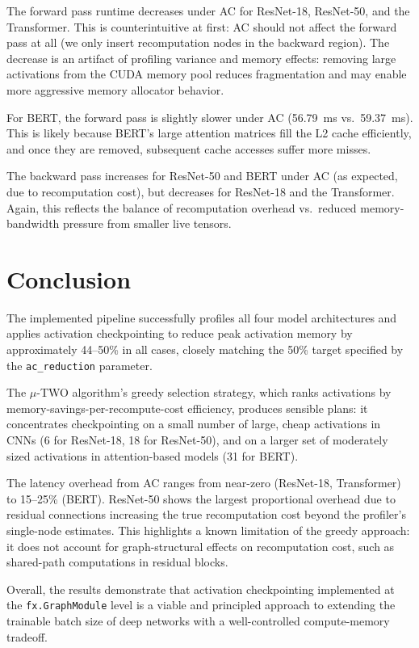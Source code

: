 \documentclass[11pt]{article}
\begin{document}
The forward pass runtime decreases under AC for ResNet-18, ResNet-50, and
the Transformer. This is counterintuitive at first: AC should not affect
the forward pass at all (we only insert recomputation nodes in the backward
region). The decrease is an artifact of profiling variance and memory
effects: removing large activations from the CUDA memory pool reduces
fragmentation and may enable more aggressive memory allocator behavior.

For BERT, the forward pass is slightly slower under AC (56.79~ms vs.\
59.37~ms). This is likely because BERT's large attention matrices fill the
L2 cache efficiently, and once they are removed, subsequent cache accesses
suffer more misses.

The backward pass increases for ResNet-50 and BERT under AC (as expected,
due to recomputation cost), but decreases for ResNet-18 and the Transformer.
Again, this reflects the balance of recomputation overhead vs.\ reduced
memory-bandwidth pressure from smaller live tensors.

\section{Conclusion}

The implemented pipeline successfully profiles all four model architectures
and applies activation checkpointing to reduce peak activation memory by
approximately 44--50\% in all cases, closely matching the 50\% target
specified by the \texttt{ac\_reduction} parameter.

The $\mu$-TWO algorithm's greedy selection strategy, which ranks activations
by memory-savings-per-recompute-cost efficiency, produces sensible plans:
it concentrates checkpointing on a small number of large, cheap activations
in CNNs (6 for ResNet-18, 18 for ResNet-50), and on a larger set of
moderately sized activations in attention-based models (31 for BERT).

The latency overhead from AC ranges from near-zero (ResNet-18, Transformer)
to 15--25\% (BERT). ResNet-50 shows the largest proportional overhead due
to residual connections increasing the true recomputation cost beyond the
profiler's single-node estimates. This highlights a known limitation of
the greedy approach: it does not account for graph-structural effects on
recomputation cost, such as shared-path computations in residual blocks.

Overall, the results demonstrate that activation checkpointing implemented
at the \texttt{fx.GraphModule} level is a viable and principled approach
to extending the trainable batch size of deep networks with a well-controlled
compute-memory tradeoff.
\end{document}
